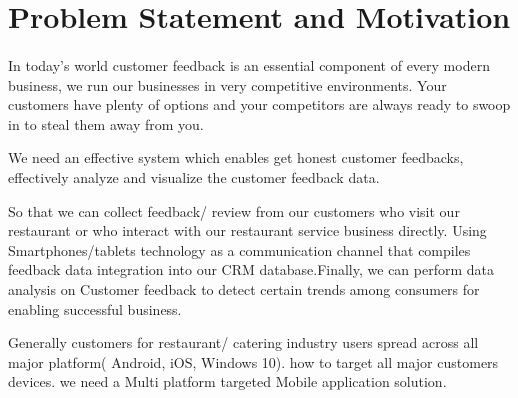 \section{Problem Statement and Motivation}







\paragraph{}
In today’s world customer feedback is an essential component of every modern business, we run our businesses in very competitive environments.
Your customers have plenty of options and your competitors are always ready to swoop in to steal them away from you.

 We need an effective system which enables get honest customer feedbacks, effectively analyze and visualize the customer feedback data.

So that we can collect feedback/ review from our customers who visit our restaurant or who interact with our restaurant service business directly. Using Smartphones/tablets technology as a communication channel that compiles feedback data integration into our CRM database.Finally, we can perform data analysis on Customer feedback to detect certain trends among consumers for enabling successful business.

Generally customers for restaurant/ catering industry users spread across all major platform( Android, iOS, Windows 10). how to target all major customers devices. we need a Multi platform targeted Mobile application solution.


